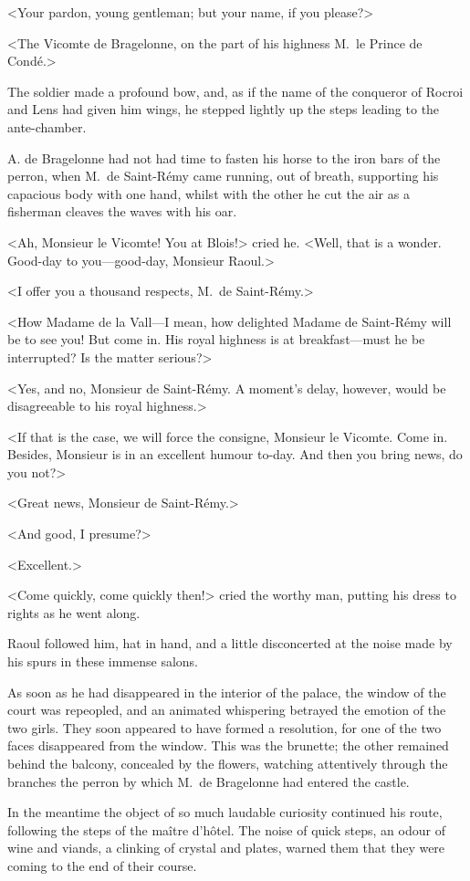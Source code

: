 <Your pardon, young gentleman; but your name, if you please?>

<The Vicomte de Bragelonne, on the part of his highness M.~le Prince de Condé.>

The soldier made a profound bow, and, as if the name of the conqueror of Rocroi and Lens had given him wings, he stepped lightly up the steps leading to the ante-chamber.

A. de Bragelonne had not had time to fasten his horse to the iron bars of the perron, when M.~de Saint-Rémy came running, out of breath, supporting his capacious body with one hand, whilst with the other he cut the air as a fisherman cleaves the waves with his oar.

<Ah, Monsieur le Vicomte! You at Blois!> cried he. <Well, that is a wonder. Good-day to you—good-day, Monsieur Raoul.>

<I offer you a thousand respects, M.~de Saint-Rémy.>

<How Madame de la Vall—I mean, how delighted Madame de Saint-Rémy will be to see you! But come in. His royal highness is at breakfast—must he be interrupted? Is the matter serious?>

<Yes, and no, Monsieur de Saint-Rémy. A moment's delay, however, would be disagreeable to his royal highness.>

<If that is the case, we will force the consigne, Monsieur le Vicomte. Come in. Besides, Monsieur is in an excellent humour to-day. And then you bring news, do you not?>

<Great news, Monsieur de Saint-Rémy.>

<And good, I presume?>

<Excellent.>

<Come quickly, come quickly then!> cried the worthy man, putting his dress to rights as he went along.

Raoul followed him, hat in hand, and a little disconcerted at the noise made by his spurs in these immense salons.

As soon as he had disappeared in the interior of the palace, the window of the court was repeopled, and an animated whispering betrayed the emotion of the two girls. They soon appeared to have formed a resolution, for one of the two faces disappeared from the window. This was the brunette; the other remained behind the balcony, concealed by the flowers, watching attentively through the branches the perron by which M.~de Bragelonne had entered the castle.

In the meantime the object of so much laudable curiosity continued his route, following the steps of the maître d'hôtel. The noise of quick steps, an odour of wine and viands, a clinking of crystal and plates, warned them that they were coming to the end of their course.

